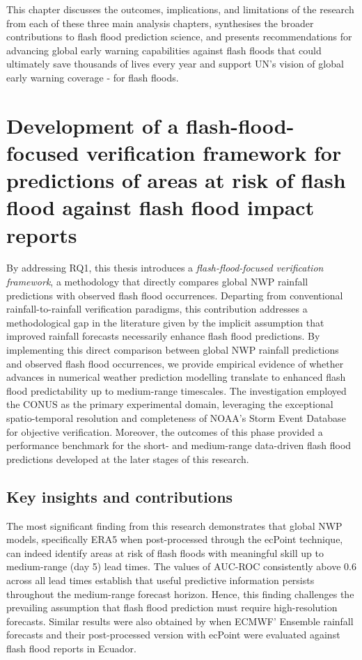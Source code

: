 This chapter discusses the outcomes, implications, and limitations of the research from each of these three main analysis chapters, synthesises the broader contributions to flash flood prediction science, and presents recommendations for advancing global early warning capabilities against flash floods that could ultimately save thousands of lives every year and support UN's vision of global early warning coverage - for flash floods.


\section{Development of a flash-flood-focused verification framework for predictions of areas at risk of flash flood against flash flood impact reports}

By addressing RQ1, this thesis introduces a \textit{flash-flood-focused verification framework}, a methodology that directly compares global NWP rainfall predictions with observed flash flood occurrences. Departing from conventional rainfall-to-rainfall verification paradigms, this contribution addresses a methodological gap in the literature given by the implicit assumption that improved rainfall forecasts necessarily enhance flash flood predictions. By implementing this direct comparison between global NWP rainfall predictions and observed flash flood occurrences, we provide empirical evidence of whether advances in numerical weather prediction modelling translate to enhanced flash flood predictability up to medium-range timescales. The investigation employed the CONUS as the primary experimental domain, leveraging the exceptional spatio-temporal resolution and completeness of NOAA's Storm Event Database for objective verification. Moreover, the outcomes of this phase provided a performance benchmark for the short- and medium-range data-driven flash flood predictions developed at the later stages of this research.


\subsection{Key insights and contributions}

The most significant finding from this research demonstrates that global NWP models, specifically ERA5 when post-processed through the ecPoint technique, can indeed identify areas at risk of flash floods with meaningful skill up to medium-range (day 5) lead times. The values of AUC-ROC consistently above 0.6 across all lead times establish that useful predictive information persists throughout the medium-range forecast horizon. Hence, this finding challenges the prevailing assumption that flash flood prediction must require high-resolution forecasts. Similar results were also obtained by \citet{Pillosu_2024} when ECMWF' Ensemble rainfall forecasts and their post-processed version with ecPoint were evaluated against flash flood reports in Ecuador. 

